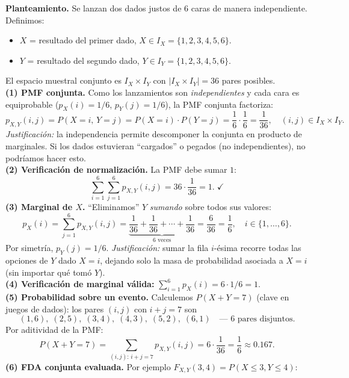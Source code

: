 \documentclass[10pt,a4paper]{article}
\numberwithin{equation}{section}
\newcounter{excount}[section]
\renewcommand{\theexcount}{\thesection.\arabic{excount}}
\newenvironment{ejemplo}[1]{%
  \refstepcounter{excount}%
  \begin{tcolorbox}[exbox, title={Ejemplo \theexcount\ \textperiodcentered\ #1}]%
}{\end{tcolorbox}}
\begin{document}
\begin{ejemplo}{Dos dados: PMF conjunta y marginales}
  \textbf{Planteamiento.} Se lanzan dos dados justos de $6$ caras de manera independiente.
  Definimos:
  \begin{itemize}
    \item $X$ = resultado del primer dado, $X \in I_X = \{1,2,3,4,5,6\}$.
    \item $Y$ = resultado del segundo dado, $Y \in I_Y = \{1,2,3,4,5,6\}$.
  \end{itemize}
  El espacio muestral conjunto es $I_X \times I_Y$ con $|I_X \times I_Y| = 36$ pares posibles.
  \\[5pt]
  \textbf{(1) PMF conjunta.} Como los lanzamientos son \emph{independientes} y cada cara es
  equiprobable ($p_X(i) = 1/6$, $p_Y(j) = 1/6$), la PMF conjunta factoriza:
  \[
    p_{X,Y}(i,j) = P(X=i,\, Y=j) = P(X=i)\cdot P(Y=j) = \frac{1}{6}\cdot\frac{1}{6} = \frac{1}{36},
    \quad (i,j) \in I_X \times I_Y.
  \]
  \emph{Justificaci\'on:} la independencia permite descomponer la conjunta en producto de
  marginales. Si los dados estuvieran ``cargados'' o pegados (no independientes), no
  podr\'iamos hacer esto.
  \\[5pt]
  \textbf{(2) Verificaci\'on de normalizaci\'on.} La PMF debe sumar $1$:
  \[
    \sum_{i=1}^{6}\sum_{j=1}^{6} p_{X,Y}(i,j) = 36 \cdot \frac{1}{36} = 1. \;\checkmark
  \]
  \textbf{(3) Marginal de $X$.} ``Eliminamos'' $Y$ \emph{sumando} sobre todos sus valores:
  \[
    p_X(i) = \sum_{j=1}^{6} p_{X,Y}(i,j) = \underbrace{\frac{1}{36} + \frac{1}{36} + \cdots + \frac{1}{36}}_{6 \text{ veces}}
    = \frac{6}{36} = \frac{1}{6},
    \quad i \in \{1,\ldots,6\}.
  \]
  Por simetr\'ia, $p_Y(j) = 1/6$. \emph{Justificaci\'on:} sumar la fila $i$-\'esima recorre
  todas las opciones de $Y$ dado $X = i$, dejando solo la masa de probabilidad asociada a
  $X = i$ (sin importar qu\'e tom\'o $Y$).
  \\[5pt]
  \textbf{(4) Verificaci\'on de marginal v\'alida:} $\sum_{i=1}^6 p_X(i) = 6 \cdot 1/6 = 1$. \;\checkmark
  \\[5pt]
  \textbf{(5) Probabilidad sobre un evento.} Calculemos $P(X + Y = 7)$ (clave en juegos de dados):
  los pares $(i,j)$ con $i+j = 7$ son
  \[
    (1,6),\; (2,5),\; (3,4),\; (4,3),\; (5,2),\; (6,1) \quad \text{--- $6$ pares disjuntos.}
  \]
  Por aditividad de la PMF:
  \[
    P(X+Y = 7) = \sum_{(i,j):\, i+j=7} p_{X,Y}(i,j) = 6 \cdot \frac{1}{36} = \frac{1}{6} \approx 0.167.
  \]
  \textbf{(6) FDA conjunta evaluada.} Por ejemplo $F_{X,Y}(3, 4) = P(X\leq 3, Y\leq 4)$:

\end{ejemplo}
\end{document}
